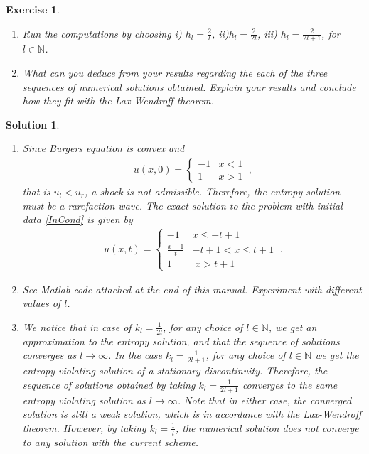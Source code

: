 \documentclass[10pt,letterpaper]{article}
\theoremstyle{break}
\newtheorem{exercise}{Exercise}
\newtheorem{solution}{Solution}
\begin{document}
\begin{exercise}
\begin{enumerate}
        \item Run the computations by choosing i) $h_l = \frac{2}{l}$, ii)$h_l = \frac{2}{2 l}$, iii) $h_l = \frac{2}{2 l + 1}$, for $l\in\mathbb{N}$.

        \item
        What can you deduce from your results regarding the each of the three sequences of numerical solutions obtained.
        Explain your results and conclude how they fit with the Lax-Wendroff theorem.
    \end{enumerate}
\end{exercise}

\begin{solution} \label{exLWTNonConvSeq}
    \begin{enumerate}
    \item
    Since Burgers equation is convex and
    \begin{gather} \label{InCond}
        u(x,0)=\begin{cases}
            -1 & x<1\\
            1 & x>1
        \end{cases}\ ,
    \end{gather}
    that is $u_l<u_r$, a shock is not admissible.
    Therefore, the entropy solution must be a rarefaction wave.
    The exact solution to the problem with initial data \eqref{InCond} is given by
    \begin{gather}
        u(x,t)=\begin{cases}
            -1 & x\leq-t+1\\
            \frac{x-1}{t} & -t+1<x\leq t+1\\
            1 & \; x>t+1
        \end{cases}\ .
    \end{gather}

    \item[(b),(c)]
    \addtocounter{enumii}{2}
    See Matlab code attached at the end of this manual. Experiment with different values of $l$.

    \item
    We notice that in case of $k_{l}=\frac{1}{2l}$, for any choice
    of $l\in\mathbb{N}$, we get an approximation to the entropy solution,
    and that the sequence of solutions converges as $l\rightarrow\infty$.
    In the case $k_{l}=\frac{1}{2l+1}$, for any choice of $l\in\mathbb{N}$ we get the entropy violating solution of a stationary discontinuity.
    Therefore, the sequence of solutions obtained by taking $k_{l}=\frac{1}{2l+1}$ converges to the same entropy violating solution as $l\rightarrow\infty$.
    Note that in either case, the converged solution is still a weak solution, which is in accordance with the Lax-Wendroff theorem. However, by taking $k_{l}=\frac{1}{l}$, the numerical solution does not converge to any solution with the current scheme.
    \end{enumerate}
\end{solution}
\end{document}
